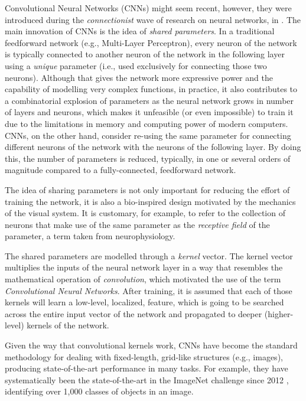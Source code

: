 

Convolutional Neural Networks (CNNs) might seem recent,
however, they were introduced during the
\emph{connectionist} wave of research on neural networks, in
\textcite{lecun1989generalization, lecun1989handwritten}.
The main innovation of CNNs is the idea of \emph{shared
parameters}. In a traditional feedforward network (e.g.,
Multi-Layer Perceptron), every neuron of the network is
typically connected to another neuron of the network in the
following layer using a \emph{unique} parameter (i.e., used
exclusively for connecting those two neurons). Although that
gives the network more expressive power and the capability
of modelling very complex functions, in practice, it also
contributes to a combinatorial explosion of parameters as
the neural network grows in number of layers and neurons,
which makes it unfeasible (or even impossible) to train it
due to the limitations in memory and computing power of
modern computers. CNNs, on the other hand, consider re-using
the same parameter for connecting different neurons of the
network with the neurons of the following layer. By doing
this, the number of parameters is reduced, typically, in one
or several orders of magnitude compared to a
fully-connected, feedforward network.

The idea of sharing parameters is not only important for
reducing the effort of training the network, it is also a
bio-inspired design motivated by the mechanics of the visual
system. It is customary, for example, to refer to the
collection of neurons that make use of the same parameter as
the \emph{receptive field} of the parameter, a term taken
from neurophysiology.

The shared parameters are modelled through a \emph{kernel}
vector. The kernel vector multiplies the inputs of the
neural network layer in a way that resembles the
mathematical operation of \emph{convolution}, which
motivated the use of the term \emph{Convolutional Neural
Networks}. After training, it is assumed that each of those
kernels will learn a low-level, localized, feature, which is
going to be searched across the entire input vector of the
network and propagated to deeper (higher-level) kernels of
the network.

Given the way that convolutional kernels work, CNNs have
become the standard methodology for dealing with
fixed-length, grid-like structures (e.g., images), producing
state-of-the-art performance in many tasks. For example,
they have systematically been the state-of-the-art in the
ImageNet challenge since 2012
\parencite{krizhevsky2012imagenet}, identifying over 1,000
classes of objects in an image.


